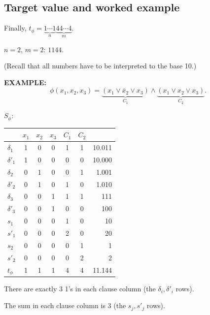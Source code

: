 \subsection{Target value and worked example}
Finally, $t_\phi=\underbrace{1\cdots1}_{n}\underbrace{44\cdots4}_{m}$.

$n=2$, $m=2$: $1144$.

(Recall that all numbers have to be interpreted to the base 10.)

\textbf{EXAMPLE:}
\[
\phi(x_1,x_2,x_3)=\underbrace{(x_1\lor\bar x_2\lor x_3)}_{C_1}\land\underbrace{(x_1\lor x_2\lor x_3)}_{C_2}.
\]
\begin{samepage}
$S_\phi$:
\begin{center}
\begin{tabular}{lccc|cc|r}
&$x_1$&$x_2$&$x_3$&$C_1$&$C_2$&\\\hline
$\delta_1$&1&0&0&1&1&10.011\\
$\delta'_1$&1&0&0&0&0&10.000\\
$\delta_2$&0&1&0&0&1&1.001\\
$\delta'_2$&0&1&0&1&0&1.010\\
$\delta_3$&0&0&1&1&1&111\\
$\delta'_3$&0&0&1&0&0&100\\\hline
$s_1$&0&0&0&1&0&10\\
$s'_1$&0&0&0&2&0&20\\
$s_2$&0&0&0&0&1&1\\
$s'_2$&0&0&0&0&2&2\\\hline
$t_\phi$&1&1&1&4&4&11.144
\end{tabular}
\end{center}
\end{samepage}
There are exactly 3 1's in each clause column (the $\delta_i,\delta'_i$ rows).

The sum in each clause column is 3 (the $s_j,s'_j$ rows).
